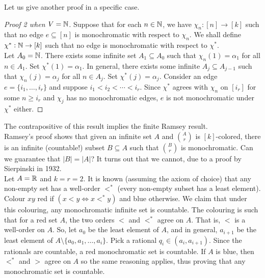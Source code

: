 	Let us give another proof in a specific case.

	\begin{proof}[Proof 2 when $V = \mathbb{N}$]
		Suppose that for each $n\in\mathbb{N}$, we have $\chi_n : [n] \to [k]$ such that no edge $e \subseteq [n]$ is monochromatic with respect to $\chi_n$. We shall define $\chi^* : \mathbb{N} \to [k]$ such that no edge is monochromatic with respect to $\chi^*$.\\
		Let $A_0 = \mathbb{N}$. There exists some infinite set $A_1 \subseteq A_0$ such that $\chi_n(1) = \alpha_1$ for all $n \in A_1$. Set $\chi^*(1) = \alpha_1$. In general, there exists some infinite $A_{j} \subseteq A_{j-1}$ such that $\chi_n(j) = \alpha_j$ for all $n \in A_j$. Set $\chi^*(j) = \alpha_j$. Consider an edge $e = \{i_1,\ldots,i_r\}$ and suppose $i_1 < i_2 < \cdots < i_r$. Since $\chi^*$ agrees with $\chi_n$ on $[i_r]$ for some $n \ge i_r$ and $\chi_j$ has no monochromatic edges, $e$ is not monochromatic under $\chi^*$ either. 
	\end{proof}

	The contrapositive of this result implies the finite Ramsey result.\\

	Ramsey's proof shows that given an infinite set $A$ and $\binom{A}{r}$ is $[k]$-colored, there is an infinite (countable!) subset $B \subseteq A$ such that $\binom{B}{r}$ is monochromatic. Can we guarantee that $|B| = |A|$? It turns out that we cannot, due to a proof by Sierpinski in 1932.\\
	Let $A = \mathbb{R}$ and $k=r=2$. It is known (assuming the axiom of choice) that any non-empty set has a well-order $<^*$ (every non-empty subset has a least element).\\
	Colour $xy$ red if $(x<y \iff x<^* y)$ and blue otherwise. We claim that under this colouring, any monochromatic infinite set is countable. The colouring is such that for a red set $A$, the two orders $<$ and $<^*$ agree on $A$. That is, $<$ is a well-order on $A$. So, let $a_0$ be the least element of $A$, and in general, $a_{i+1}$ be the least element of $A \setminus \{a_0,a_1,\ldots,a_i\}$. Pick a rational $q_i \in (a_i,a_{i+1})$. Since the rationals are countable, a red monochromatic set is countable. If $A$ is blue, then $<^*$ and $>$ agree on $A$ so the same reasoning applies, thus proving that any monochromatic set is countable. 